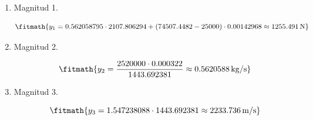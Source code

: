 \begin{enumerate}

\item Magnitud 1.

\[\fitmath{y_{1}=0.562058795\cdot 2107.806294+\left(74507.4482-25000\right)\cdot 0.00142968\approx 1255.491\,\mathrm{N}}\]

\item Magnitud 2.

\[\fitmath{y_{2}=\frac{2520000\cdot 0.000322}{1443.692381}\approx 0.5620588\,\mathrm{kg/s}}\]

\item Magnitud 3.

\[\fitmath{y_{3}=1.547238088\cdot 1443.692381\approx 2233.736\,\mathrm{m/s}}\]

\end{enumerate}
